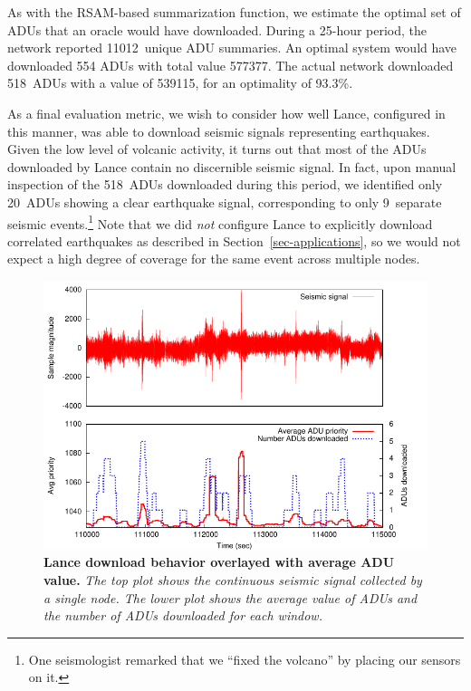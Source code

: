 
As with the RSAM-based summarization function, we estimate the optimal set of
ADUs that an oracle would have downloaded. During a 25-hour period, the
network reported 11012~unique ADU summaries. An optimal system would have
downloaded 554 ADUs with total value 577377.  The actual network
downloaded 518~ADUs with a value of 539115, for an optimality of 93.3\%. 


As a final evaluation metric, we wish to consider how well Lance,
configured in this manner, was able to download seismic signals
representing earthquakes. Given the low level of volcanic activity, 
it turns out that most of the ADUs downloaded by Lance contain no 
discernible seismic signal. In fact, upon manual inspection of the
518~ADUs downloaded during this period, we identified only 20~ADUs
showing a clear earthquake signal, corresponding to only 9~separate
seismic events.\footnote{One seismologist remarked that we 
``fixed the volcano'' by placing our sensors on it.}
Note that we did {\em not} configure Lance to explicitly download 
correlated earthquakes as described in Section~\ref{sec-applications},
so we would not expect a high degree of coverage for the same event
across multiple nodes.

\begin{figure}[t]
\begin{center}
\includegraphics[width=1.0\hsize]{./lance/figs/deploy/deploydownloads/everything.pdf}
\end{center}
\caption{\small {\bf Lance download behavior overlayed with average
ADU value.} {\em The top plot shows the continuous seismic signal
collected by a single node. The lower plot shows the average value
of ADUs and the number of ADUs downloaded for each window.}}
\label{fig-downloads-cont}
\end{figure}

